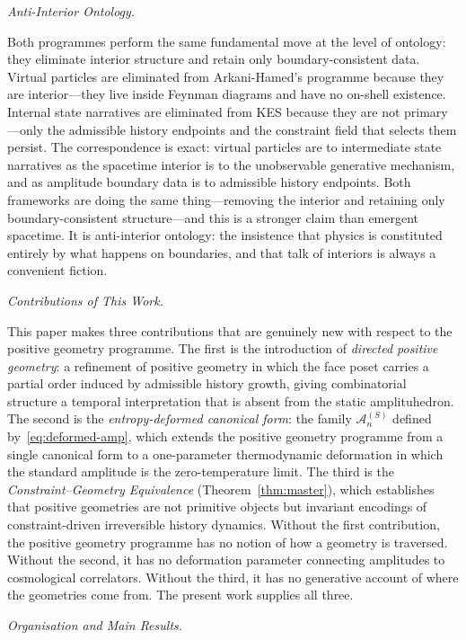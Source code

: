 \documentclass[11pt]{article}
\theoremstyle{plain}
\theoremstyle{definition}
\theoremstyle{remark}
\newcommand{\Sf}{S}
\begin{document}
\medskip\noindent\textit{Anti-Interior Ontology.}

Both programmes perform the same fundamental move at the level of ontology: they eliminate interior structure and retain only boundary-consistent data. Virtual particles are eliminated from Arkani-Hamed's programme because they are interior---they live inside Feynman diagrams and have no on-shell existence. Internal state narratives are eliminated from KES because they are not primary---only the admissible history endpoints and the constraint field that selects them persist. The correspondence is exact: virtual particles are to intermediate state narratives as the spacetime interior is to the unobservable generative mechanism, and as amplitude boundary data is to admissible history endpoints. Both frameworks are doing the same thing---removing the interior and retaining only boundary-consistent structure---and this is a stronger claim than emergent spacetime. It is anti-interior ontology: the insistence that physics is constituted entirely by what happens on boundaries, and that talk of interiors is always a convenient fiction.

\medskip\noindent\textit{Contributions of This Work.}

This paper makes three contributions that are genuinely new with respect to the positive geometry programme. The first is the introduction of \emph{directed positive geometry}: a refinement of positive geometry in which the face poset carries a partial order induced by admissible history growth, giving combinatorial structure a temporal interpretation that is absent from the static amplituhedron. The second is the \emph{entropy-deformed canonical form}: the family $\mathcal{A}_n^{(\Sf)}$ defined by~\eqref{eq:deformed-amp}, which extends the positive geometry programme from a single canonical form to a one-parameter thermodynamic deformation in which the standard amplitude is the zero-temperature limit. The third is the \emph{Constraint--Geometry Equivalence} (Theorem~\ref{thm:master}), which establishes that positive geometries are not primitive objects but invariant encodings of constraint-driven irreversible history dynamics. Without the first contribution, the positive geometry programme has no notion of how a geometry is traversed. Without the second, it has no deformation parameter connecting amplitudes to cosmological correlators. Without the third, it has no generative account of where the geometries come from. The present work supplies all three.

\medskip\noindent\textit{Organisation and Main Results.}
\end{document}
